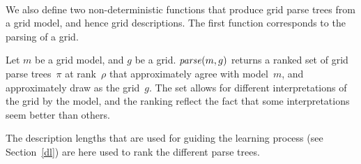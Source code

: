 \documentclass[a4paper]{llncs}
\begin{document}
\paragraph{}
We also define two non-deterministic functions that produce grid parse
trees from a grid model, and hence grid descriptions. The first
function corresponds to the parsing of a grid.

\begin{definition}
  Let $m$ be a grid model, and $g$ be a grid. ${\it parse}(m,g)$
  returns a ranked set of grid parse trees~$\pi$ at rank~$\rho$ that
  approximately agree with model~$m$, and approximately draw as the
  grid~$g$. The set allows for different interpretations of the grid
  by the model, and the ranking reflect the fact that some
  interpretations seem better than others.
\end{definition}

The description lengths that are used for guiding the learning process
(see Section~\ref{dl}) are here used to rank the different parse
trees.
\end{document}
